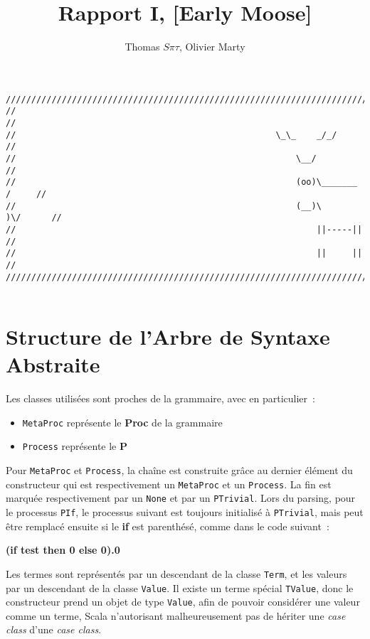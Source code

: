 \documentclass[11pt]{article} %
\title{Rapport I,  [Early Moose]}
\author{Thomas $S\pi\tau$, Olivier Marty}
\begin{document}
\maketitle

\begin{verbatim}
////////////////////////////////////////////////////////////////////////////////
//                                                                            //
//                                                   \_\_    _/_/             //
//                                                       \__/                 //
//                                                       (oo)\_______   /     //
//                                                       (__)\       )\/      //
//                                                           ||-----||        //
//                                                           ||     ||        //
////////////////////////////////////////////////////////////////////////////////  


\end{verbatim}
\section{Structure de l'Arbre de Syntaxe Abstraite}

Les classes utilisées sont proches de la grammaire, avec en particulier~:
\begin{itemize}
 \item  \texttt{MetaProc} représente le \textbf{Proc} de la grammaire
 \item  \texttt{Process} représente le \textbf{P}
\end{itemize}

Pour \texttt{MetaProc} et \texttt{Process}, la chaîne est construite grâce au dernier élément du constructeur qui est respectivement un \texttt{MetaProc} et un \texttt{Process}. La fin est marquée respectivement par un \texttt{None} et par un \texttt{PTrivial}.
Lors du parsing, pour le processus \texttt{PIf}, le processus suivant est toujours initialisé à \texttt{PTrivial}, mais peut être remplacé ensuite si le \textbf{if} est parenthésé, comme dans le code suivant~:
\begin{center}
 \textbf{(if test then 0 else 0).0}
\end{center}

Les termes sont représentés par un descendant de la classe \texttt{Term}, et les valeurs par un descendant de la classe \texttt{Value}. Il existe un terme spécial \texttt{TValue}, donc le constructeur prend un objet de type \texttt{Value}, afin de pouvoir considérer une valeur comme un terme, Scala n'autorisant malheureusement pas de hériter une \emph{case class} d'une \emph{case class}.
\end{document}
